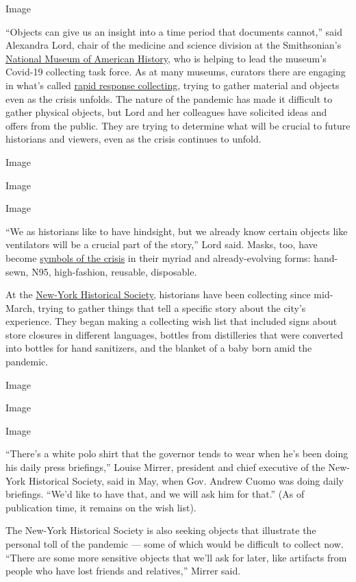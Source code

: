 Image

``Objects can give us an insight into a time period that documents
cannot,'' said Alexandra Lord, chair of the medicine and science
division at the Smithsonian's
\href{https://americanhistory.si.edu}{National Museum of American
History}, who is helping to lead the museum's Covid-19 collecting task
force. As at many museums, curators there are engaging in what's called
\href{https://www.nytimes.com/2020/07/14/style/museums-coronavirus-protests-2020.html}{rapid
response collecting}, trying to gather material and objects even as the
crisis unfolds. The nature of the pandemic has made it difficult to
gather physical objects, but Lord and her colleagues have solicited
ideas and offers from the public. They are trying to determine what will
be crucial to future historians and viewers, even as the crisis
continues to unfold.

Image

Image

Image

``We as historians like to have hindsight, but we already know certain
objects like ventilators will be a crucial part of the story,'' Lord
said. Masks, too, have become
\href{https://www.nytimes.com/2020/05/15/style/the-hidden-language-of-masks-smithsonian.html}{symbols
of the crisis} in their myriad and already-evolving forms: hand-sewn,
N95, high-fashion, reusable, disposable.

At the \href{https://www.nyhistory.org}{New-York Historical Society},
historians have been collecting since mid-March, trying to gather things
that tell a specific story about the city's experience. They began
making a collecting wish list that included signs about store closures
in different languages, bottles from distilleries that were converted
into bottles for hand sanitizers, and the blanket of a baby born amid
the pandemic.

Image

Image

Image

``There's a white polo shirt that the governor tends to wear when he's
been doing his daily press briefings,'' Louise Mirrer, president and
chief executive of the New-York Historical Society, said in May, when
Gov. Andrew Cuomo was doing daily briefings. ``We'd like to have that,
and we will ask him for that.'' (As of publication time, it remains on
the wish list).

The New-York Historical Society is also seeking objects that illustrate
the personal toll of the pandemic --- some of which would be difficult
to collect now. ``There are some more sensitive objects that we'll ask
for later, like artifacts from people who have lost friends and
relatives,'' Mirrer said.

